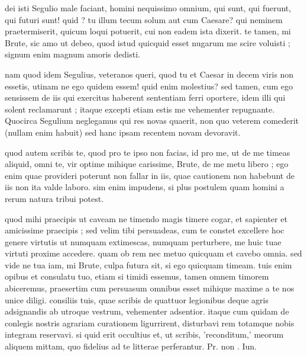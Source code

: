 


 dei isti Segulio male faciant, homini nequissimo omnium, qui sunt, qui fuerunt, qui futuri sunt! quid ? tu illum tecum solum aut cum Caesare? qui neminem praetermiserit, quicum loqui potuerit, cui non eadem ista dixerit. te tamen, mi Brute, sic amo ut debeo, quod istud quicquid esset nugarum me scire voluisti ; signum enim magnum amoris dedisti.

 nam quod idem Segulius, veteranos queri, quod tu et Caesar in decem viris non essetis, utinam ne ego quidem essem! quid enim molestius? sed tamen, cum ego sensissem de iis qui exercitus haberent sententiam ferri oportere, idem illi qui solent reclamarunt ; itaque excepti etiam estis me vehementer repugnante. Quocirca Segulium neglegamus qui res novas quaerit, non quo veterem comederit (nullam enim habuit) sed hanc ipsam recentem novam devoravit.

 quod autem scribis te, quod pro te ipso non facias, id pro me, ut de me timeas aliquid, omni te, vir optime mihique carissime, Brute, de me metu libero ; ego enim quae provideri poterunt non fallar in iis, quae cautionem non habebunt de iis non ita valde laboro. sim enim impudens, si plus postulem quam homini a rerum natura tribui potest.

 quod mihi praecipis ut caveam ne timendo magis timere cogar, et sapienter et amicissime praecipis ; sed velim tibi persuadeas, cum te constet excellere hoc genere virtutis ut numquam extimescas, numquam perturbere, me huic tuae virtuti proxime accedere. quam ob rem nec metuo quicquam et cavebo omnia. sed vide ne tua iam, mi Brute, culpa futura sit, si ego quicquam timeam. tuis enim opibus et consulatu tuo, etiam si timidi essemus, tamen omnem timorem abiceremus, praesertim cum persuasum omnibus esset mihique maxime a te nos unice diligi. consiliis tuis, quae scribis de quattuor legionibus deque agris adsignandis ab utroque vestrum, vehementer adsentior. itaque cum quidam de conlegis nostris agrariam curationem ligurrirent, disturbavi rem totamque nobis integram reservavi. si quid erit occultius et, ut scribis, 'reconditum,' meorum aliquem mittam, quo fidelius ad te litterae perferantur. Pr. non . Iun.
